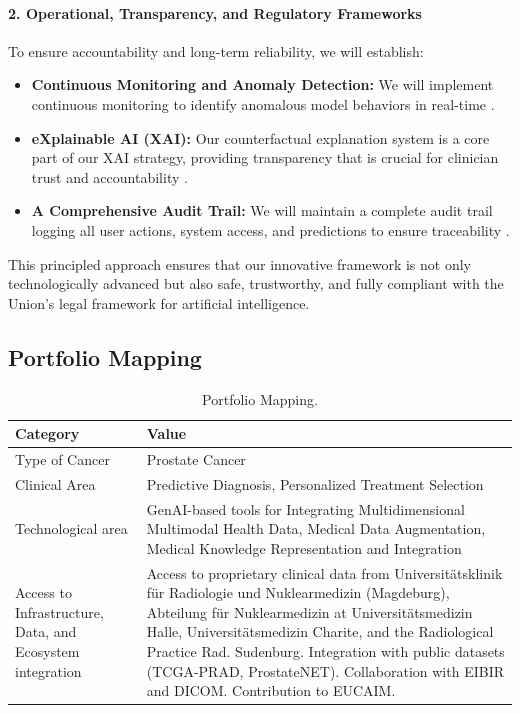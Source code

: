 \documentclass[11pt, a4paper]{article}
\begin{document}
\begin{itemize}
\paragraph{2. Operational, Transparency, and Regulatory Frameworks}
To ensure accountability and long-term reliability, we will establish:
\begin{itemize}
    \item \textbf{Continuous Monitoring and Anomaly Detection:} We will implement continuous monitoring to identify anomalous model behaviors in real-time \cite{AlAttar2023,GarcaGmezBlanesSelva2023}.
    \item \textbf{eXplainable AI (XAI):} Our counterfactual explanation system is a core part of our XAI strategy, providing transparency that is crucial for clinician trust and accountability \cite{GarcaGmezBlanesSelva2023,JamesIjiga2024}.
    \item \textbf{A Comprehensive Audit Trail:} We will maintain a complete audit trail logging all user actions, system access, and predictions to ensure traceability \cite{GarcaGmezBlanesSelva2023,KhadkaEpiphaniou2025}.
\end{itemize}
\end{itemize}

This principled approach ensures that our innovative framework is not only technologically advanced but also safe, trustworthy, and fully compliant with the Union's legal framework for artificial intelligence.

\subsection{Portfolio Mapping}
\begin{table}[H]
    \centering
    \caption{Portfolio Mapping.}
    \label{tab:portfolio_mapping}
    \small
    \begin{tabular}{p{} p{}}
        \toprule
        \textbf{Category} & \textbf{Value} \\
        \midrule
        Type of Cancer & Prostate Cancer \\
        \midrule
        Clinical Area & Predictive Diagnosis, Personalized Treatment Selection \\
        \midrule
        Technological area & GenAI-based tools for Integrating Multidimensional Multimodal Health Data, Medical Data Augmentation, Medical Knowledge Representation and Integration \\
        \midrule
        Access to Infrastructure, Data, and Ecosystem integration & Access to proprietary clinical data from Universitätsklinik für Radiologie und Nuklearmedizin (Magdeburg), Abteilung für Nuklearmedizin at Universitätsmedizin Halle, Universitätsmedizin Charite, and the Radiological Practice Rad. Sudenburg. Integration with public datasets (TCGA-PRAD, ProstateNET). Collaboration with EIBIR and DICOM. Contribution to EUCAIM. \\
        \bottomrule
    \end{tabular}
\end{table}
\end{document}
